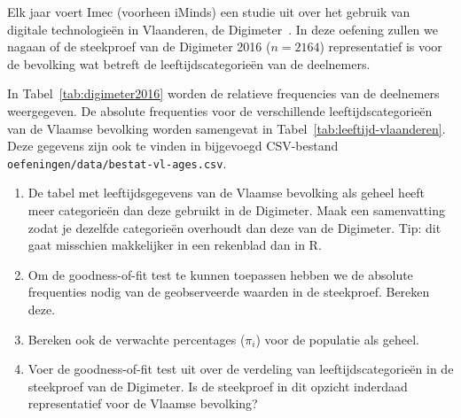 \begin{exercise}
  \label{ex:chisq-digimeter}
  
  Elk jaar voert Imec (voorheen iMinds) een studie uit over het gebruik van digitale technologieën in Vlaanderen, de Digimeter~\autocite{Vanhaelewyn2016}. In deze oefening zullen we nagaan of de steekproef van de Digimeter 2016 ($n = 2164$) representatief is voor de bevolking wat betreft de leeftijdscategorieën van de deelnemers.
  
  In Tabel~\ref{tab:digimeter2016} worden de relatieve frequencies van de deelnemers weergegeven. De absolute frequenties voor de verschillende leeftijdscategorieën van de Vlaamse bevolking worden samengevat in Tabel~\ref{tab:leeftijd-vlaanderen}. Deze gegevens zijn ook te vinden in bijgevoegd CSV-bestand \texttt{oefeningen/data/bestat-vl-ages.csv}.
  
  \begin{enumerate}
    \item De tabel met leeftijdsgegevens van de Vlaamse bevolking als geheel heeft meer categorieën dan deze gebruikt in de Digimeter. Maak een samenvatting zodat je dezelfde categorieën overhoudt dan deze van de Digimeter. Tip: dit gaat misschien makkelijker in een rekenblad dan in R.
    \item Om de goodness-of-fit test te kunnen toepassen hebben we de absolute frequenties nodig van de geobserveerde waarden in de steekproef. Bereken deze.
    \item Bereken ook de verwachte percentages ($\pi_{i}$) voor de populatie als geheel.
    \item Voer de goodness-of-fit test uit over de verdeling van leeftijdscategorieën in de steekproef van de Digimeter. Is de steekproef in dit opzicht inderdaad representatief voor de Vlaamse bevolking?
  \end{enumerate}
\end{exercise}

